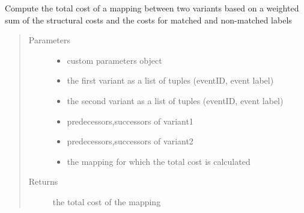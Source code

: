 \documentclass[letterpaper,10pt,english]{sphinxmanual}
\begin{document}
\begin{fulllineitems}
\label{\detokenize{cost function:costFunction.cost.costMapping}}
Compute the total cost of a mapping between two variants based on a weighted sum of the structural costs and the costs for matched and non-matched labels
\begin{quote}\begin{description}
\item[{Parameters}] \leavevmode\begin{itemize}
\item {} 
 \textendash{} custom parameters object

\item {} 
 \textendash{} the first variant as a list of tuples (eventID, event label)

\item {} 
 \textendash{} the second variant as a list of tuples (eventID, event label)

\item {} 
 \textendash{} predecessors,successors of variant1

\item {} 
 \textendash{} predecessors,successors of variant2

\item {} 
 \textendash{} the mapping for which the total cost is calculated

\end{itemize}

\item[{Returns}] \leavevmode
the total cost of the mapping

\end{description}\end{quote}

\end{fulllineitems}

\end{document}

